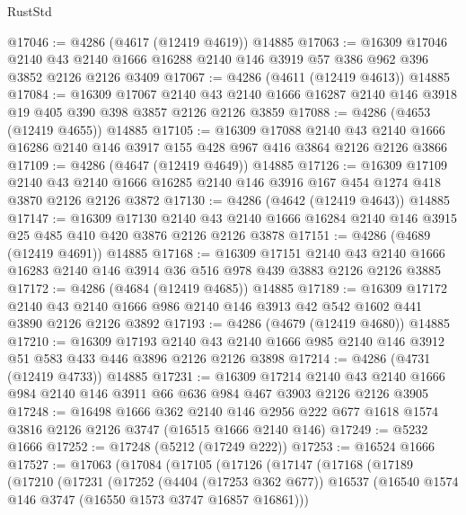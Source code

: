 \begin{lexlean}{RustStd}
\begin{coremodule}
{\begin{coremodule}
{{{{{{{{{{{{{{{{@17046 := @4286 (@4617 (@12419 @4619)) @14885
@17063 := @16309
    @17046
    @2140
    @43
    @2140
    @1666
    @16288
    @2140
    @146
    @3919
    @57
    @386
    @962
    @396
    @3852
    @2126
    @2126
    @3409
@17067 := @4286 (@4611 (@12419 @4613)) @14885
@17084 := @16309
    @17067
    @2140
    @43
    @2140
    @1666
    @16287
    @2140
    @146
    @3918
    @19
    @405
    @390
    @398
    @3857
    @2126
    @2126
    @3859
@17088 := @4286 (@4653 (@12419 @4655)) @14885
@17105 := @16309
    @17088
    @2140
    @43
    @2140
    @1666
    @16286
    @2140
    @146
    @3917
    @155
    @428
    @967
    @416
    @3864
    @2126
    @2126
    @3866
@17109 := @4286 (@4647 (@12419 @4649)) @14885
@17126 := @16309
    @17109
    @2140
    @43
    @2140
    @1666
    @16285
    @2140
    @146
    @3916
    @167
    @454
    @1274
    @418
    @3870
    @2126
    @2126
    @3872
@17130 := @4286 (@4642 (@12419 @4643)) @14885
@17147 := @16309
    @17130
    @2140
    @43
    @2140
    @1666
    @16284
    @2140
    @146
    @3915
    @25
    @485
    @410
    @420
    @3876
    @2126
    @2126
    @3878
@17151 := @4286 (@4689 (@12419 @4691)) @14885
@17168 := @16309
    @17151
    @2140
    @43
    @2140
    @1666
    @16283
    @2140
    @146
    @3914
    @36
    @516
    @978
    @439
    @3883
    @2126
    @2126
    @3885
@17172 := @4286 (@4684 (@12419 @4685)) @14885
@17189 := @16309
    @17172
    @2140
    @43
    @2140
    @1666
    @986
    @2140
    @146
    @3913
    @42
    @542
    @1602
    @441
    @3890
    @2126
    @2126
    @3892
@17193 := @4286 (@4679 (@12419 @4680)) @14885
@17210 := @16309
    @17193
    @2140
    @43
    @2140
    @1666
    @985
    @2140
    @146
    @3912
    @51
    @583
    @433
    @446
    @3896
    @2126
    @2126
    @3898
@17214 := @4286 (@4731 (@12419 @4733)) @14885
@17231 := @16309
    @17214
    @2140
    @43
    @2140
    @1666
    @984
    @2140
    @146
    @3911
    @66
    @636
    @984
    @467
    @3903
    @2126
    @2126
    @3905
@17248 := @16498
    @1666
    @362
    @2140
    @146
    @2956
    @222
    @677
    @1618
    @1574
    @3816
    @2126
    @2126
    @3747
    (@16515 @1666 @2140 @146)
@17249 := @5232 @1666
@17252 := @17248 (@5212 (@17249 @222))
@17253 := @16524 @1666
@17527 := @17063
    (@17084
      (@17105
        (@17126
          (@17147
            (@17168
              (@17189
                (@17210
                  (@17231
                    (@17252
                      (@4404 (@17253 @362 @677))
                      @16537
                      (@16540 @1574 @146 @3747 (@16550 @1573 @3747 @16857 @16861)))
}}}}}}}}}}}}}}}}
\end{coremodule}}
\end{coremodule}
\end{lexlean}
